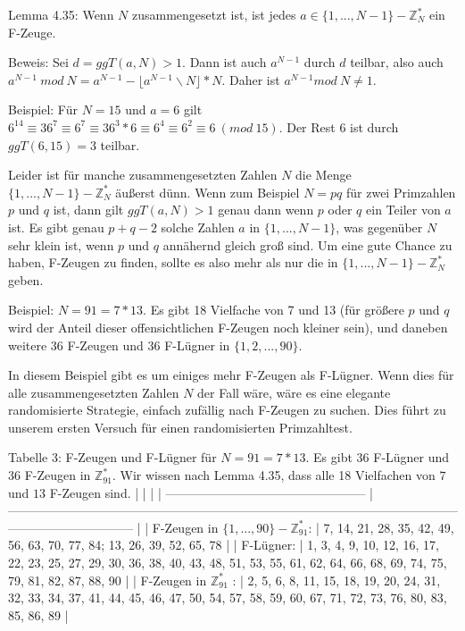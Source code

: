 \documentclass[a4paper]{article}
\begin{document}
\begin{multicols}{3}
        Lemma 4.35: Wenn $N$ zusammengesetzt ist, ist jedes $a\in\{1,...,N-1\}-\mathbb{Z}^*_N$ ein F-Zeuge.

        Beweis: Sei $d=ggT(a,N)>1$. Dann ist auch $a^{N-1}$ durch $d$ teilbar, also auch $a^{N-1}\ mod\ N=a^{N-1}- \lfloor a^{N-1}\backslash N\rfloor *N$. Daher ist $a^{N-1} mod\ N\not= 1$.

        Beispiel: Für $N=15$ und $a=6$ gilt $6^{14}\equiv 36^7\equiv 6^7 \equiv  36^3 * 6 \equiv 6^4 \equiv 6^2 \equiv 6\ (mod\ 15)$. Der Rest $6$ ist durch $ggT(6,15) = 3$ teilbar.

        Leider ist für manche zusammengesetzten Zahlen $N$ die Menge $\{1 ,...,N-1\}-\mathbb{Z}^*_N$ äußerst dünn. Wenn zum Beispiel $N=pq$ für zwei Primzahlen $p$ und $q$ ist, dann gilt $ggT(a,N)> 1$ genau dann wenn $p$ oder $q$ ein Teiler von $a$ ist. Es gibt genau $p+q-2$ solche Zahlen $a$ in $\{ 1 ,...,N-1\}$, was gegenüber $N$ sehr klein ist, wenn $p$ und $q$ annähernd gleich groß sind. Um eine gute Chance zu haben, F-Zeugen zu finden, sollte es also mehr als nur die in $\{1 ,...,N-1\}-\mathbb{Z}^*_N$ geben.

        Beispiel: $N=91 = 7*13$. Es gibt 18 Vielfache von 7 und 13 (für größere $p$ und $q$ wird der Anteil dieser offensichtlichen F-Zeugen noch kleiner sein), und daneben weitere $36$ F-Zeugen und $36$ F-Lügner in $\{1 , 2 ,..., 90\}$.

        In diesem Beispiel gibt es um einiges mehr F-Zeugen als F-Lügner. Wenn dies für alle zusammengesetzten Zahlen $N$ der Fall wäre, wäre es eine elegante randomisierte Strategie, einfach zufällig nach F-Zeugen zu suchen. Dies führt zu unserem ersten Versuch für einen randomisierten Primzahltest.

        Tabelle 3: F-Zeugen und F-Lügner für $N=91= 7*13$. Es gibt $36$ F-Lügner und $36$ F-Zeugen in $\mathbb{Z}^*_{91}$. Wir wissen nach Lemma 4.35, dass alle 18 Vielfachen von $7$ und $13$ F-Zeugen sind.
        |                                                  |                                                                                                                                            |
        | ------------------------------------------------ | ------------------------------------------------------------------------------------------------------------------------------------------ |
        | F-Zeugen in $\{ 1 ,..., 90\}-\mathbb{Z}^*_{91}$: | 7, 14, 21, 28, 35, 42, 49, 56, 63, 70, 77, 84; 13, 26, 39, 52, 65, 78                                                                      |
        | F-Lügner:                                        | 1, 3, 4, 9, 10, 12, 16, 17, 22, 23, 25, 27, 29, 30, 36, 38, 40, 43, 48, 51, 53, 55, 61, 62, 64, 66, 68, 69, 74, 75, 79, 81, 82, 87, 88, 90 |
        | F-Zeugen in $\mathbb{Z}^*_{91}$ :                | 2, 5, 6, 8, 11, 15, 18, 19, 20, 24, 31, 32, 33, 34, 37, 41, 44, 45, 46, 47, 50, 54, 57, 58, 59, 60, 67, 71, 72, 73, 76, 80, 83, 85, 86, 89 |


\end{multicols}
\end{document}
